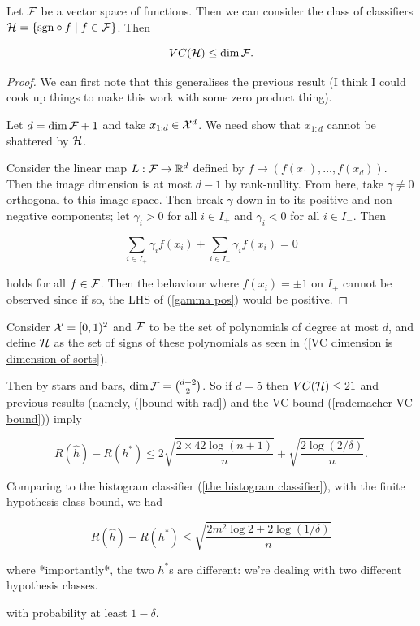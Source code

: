 \documentclass[11pt]{scrartcl}
\begin{document}
\begin{theorem}
\label{VC dimension is dimension of sorts}
Let $\mathcal{F}$ be a vector space of functions. Then we can consider the class of classifiers $\mathcal{H} = \{ \text{sgn} \circ f \mid f \in \mathcal{F} \}$. Then

\begin{equation}
VC(\H) \le \dim \F. %
\end{equation}

\begin{proof}
We can first note that this generalises the previous result (I think I could cook up things to make this work with some zero product thing).

Let $d = \dim \mathcal{F} + 1$ and take $x_{1:d} \in \mathcal{X}^d$. We need show that $x_{1:d}$ cannot be shattered by $\mathcal{H}$.

Consider the linear map $L : \mathcal{F} \rightarrow \mathbb R^d$ defined by $f \mapsto (f(x_1), ... , f(x_d))$. Then the image dimension is at most $d-1$ by rank-nullity. From here, take $\gamma \neq 0$ orthogonal to this image space. Then break $\gamma$ down in to its positive and non-negative components; let $\gamma_i > 0$ for all $i \in I_+$ and $\gamma_i < 0$ for all $i \in I_-$. Then

\begin{equation}
    \sum_{i \in I_+} \gamma_i f(x_i) + \sum_{i \in I_-} \gamma_i f(x_i) = 0
\label{gamma pos}
\end{equation}

holds for all $f \in \mathcal{F}$. Then the behaviour where $f(x_i) = \pm 1$ on $I_\pm$ cannot be observed since if so, the LHS of (\ref{gamma pos}) would be positive.
\end{proof}
\end{theorem}

\begin{example}
Consider $\mathcal{X} = [0,1)^2$ and $\mathcal{F}$ to be the set of polynomials of degree at most $d$, and define $\mathcal{H}$ as the set of signs of these polynomials as seen in (\ref{VC dimension is dimension of sorts}).

Then by stars and bars, $\dim \mathcal{F} = \binom{d+2}{2}$. So if $d=5$ then $VC(\mathcal{H}) \le 21$ and previous results (namely, (\ref{bound with rad}) and the VC bound (\ref{rademacher VC bound})) imply

\begin{equation}
    R(\hat{h}) - R(h^*) \le 2 \sqrt{\frac{2 \times 42 \log(n+1)}{n}} + \sqrt{\frac{2 \log (2/\delta)}{n}}.
\end{equation}

Comparing to the histogram classifier (\ref{the histogram classifier}), with the finite hypothesis class bound, we had

\begin{equation}
    R(\hat{h}) - R(h^*) \le \sqrt{\frac{2m^2 \log 2 + 2 \log (1 / \delta)}{n}} 
\end{equation}

where *importantly*, the two $h^*$s are different: we're dealing with two different hypothesis classes.

with probability at least $1 - \delta$.
\end{example}    
\end{document}
